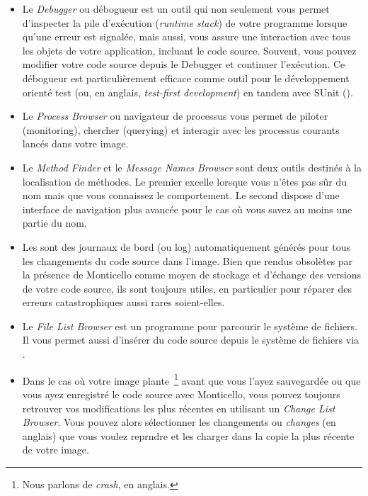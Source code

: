 \documentclass[a4paper,10pt,twoside]{book}
\begin{document}
\begin{itemize}
Vous pouvez m\^eme inspecter des outils en cliquant via le bouton bleu 
(bouton de droite) de la souris pour afficher leur \emph{halo}
et en s\'electionnant l'ic\^one
\emph{debug}
\debugHandle .
  \item Le \emph{Debugger} ou d\'ebogueur est un outil qui non seulement vous permet
d'inspecter la pile d'ex\'ecution (\emph{runtime stack}) de votre
programme lorsque qu'une erreur est signal\'ee, mais aussi, 
vous assure une interaction avec tous les objets de votre application,
incluant le code source. Souvent, vous pouvez modifier votre 
code source depuis le Debugger et continuer l'ex\'ecution.
Ce d\'ebogueur est particuli\`erement efficace comme outil pour
le d\'eveloppement orient\'e test (ou, en anglais, \emph{test-first development}) en tandem
avec 
SUnit ().
  \item Le \emph{Process Browser} ou navigateur de processus vous permet de piloter (monitoring), chercher (querying) et interagir avec les processus courants lanc\'es dans votre image.
  \item Le \emph{Method Finder} et le \emph{Message Names Browser} sont 
deux outils destin\'es \`a la localisation de m\'ethodes. Le
premier excelle lorsque vous n'\^etes pas s\^ur du nom mais que vous
connaissez le comportement.
Le second dispose d'une interface de navigation plus avanc\'ee pour le cas o\`u
vous savez au moins une partie du nom.
  \item Les \changesets sont des journaux de bord (ou log) automatiquement g\'en\'er\'es pour tous les changements du code source dans l'image.
Bien que rendus obsol\`etes par la pr\'esence de Monticello comme
moyen de stockage et d'\'echange des versions de votre code source,
ils sont toujours utiles, en particulier pour r\'eparer des erreurs
catastrophiques aussi rares soient-elles.
  \item Le \emph{File List Browser} est un programme pour parcourir le
syst\`eme de fichiers. Il vous permet aussi d'ins\'erer du code
source depuis le syst\`eme de fichiers via .
  \item Dans le cas o\`u votre image plante~\footnote{Nous parlons de \emph{crash}, en anglais.} avant que
vous l'ayez sauvegard\'ee ou que vous ayez enregistr\'e le code source
avec Monticello, vous pouvez toujours retrouver vos modifications les
plus r\'ecentes en utilisant un \emph{Change List Browser}. 
Vous pouvez alors s\'electionner les changements ou \emph{changes} (en anglais) que vous voulez reprndre et les charger dans la copie la plus r\'ecente de votre image.
\end{itemize}

\ifx\wholebook\relax\else
\end{document}
